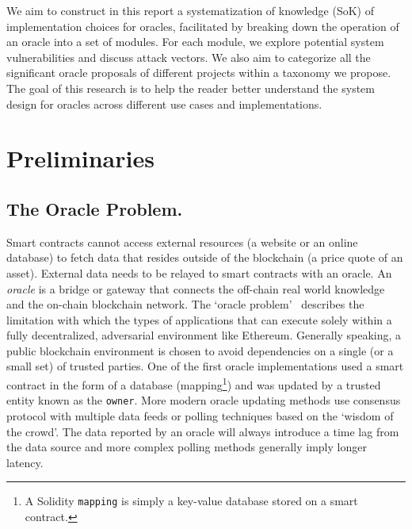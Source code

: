 We aim to construct in this report a systematization of knowledge (SoK) of implementation choices for oracles, facilitated by breaking down the operation of an oracle into a set of modules. For each module, we explore potential system vulnerabilities and discuss attack vectors. We also aim to categorize all the significant oracle proposals of different projects within a taxonomy we propose. The goal of this research is to help the reader better understand the system design for oracles across different use cases and implementations.


\section{Preliminaries}



\subsection{The Oracle Problem.}  

Smart contracts cannot access external resources (\eg a website or an online database) to fetch data that resides outside of the blockchain (\eg a price quote of an asset). External data needs to be relayed to smart contracts with an oracle. An \emph{oracle} is a bridge or gateway that connects the off-chain real world knowledge and the on-chain blockchain network. The `oracle problem'~\cite{linkOracleProblem} describes the limitation with which the types of applications that can execute solely within a fully decentralized, adversarial environment like Ethereum. Generally speaking, a public blockchain environment is chosen to avoid dependencies on a single (or a small set) of trusted parties. One of the first oracle implementations used a smart contract in the form of a database (\ie mapping\footnote{A Solidity \texttt{mapping} is simply a key-value database stored on a smart contract.}) and was updated by a trusted entity known as the \texttt{owner}. More modern oracle updating methods use consensus protocol with multiple data feeds or polling techniques based on the `wisdom of the crowd'. The data reported by an oracle will always introduce a time lag from the data source and more complex polling methods generally imply longer latency.

